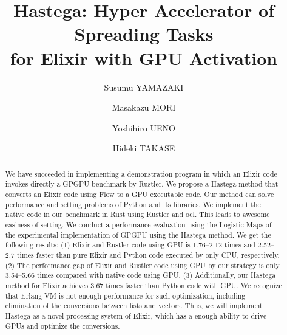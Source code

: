 \documentclass[sigplan,table]{acmart}
\begin{document}
\title{Hastega: Hyper Accelerator of Spreading Tasks \\
for Elixir with GPU Activation}

\author{Susumu YAMAZAKI}

\author{Masakazu MORI}

\author{Yoshihiro UENO}

\author{Hideki TAKASE}

\renewcommand{\shortauthors}{S. Yamazaki et al.}


\begin{abstract}
We have succeeded in implementing a demonstration program in which an Elixir code invokes directly a GPGPU benchmark by Rustler. We propose a Hastega method that converts an Elixir code using Flow to a GPU executable code. Our method can solve performance and setting problems of Python and its libraries. We implement the native code in our benchmark in Rust using Rustler and ocl. This leads to awesome easiness of setting. We conduct a performance evaluation using the Logistic Maps of the experimental implementation of GPGPU using the Hastega method. We get the following results: (1) Elixir and Rustler code using GPU is 1.76--2.12 times and 2.52--2.7 times faster than pure Elixir and Python code executed by only CPU, respectively. (2) The performance gap of Elixir and Rustler code using GPU by our strategy is only 3.54--5.66 times compared with native code using GPU. (3) Additionally, our Hastega method for Elixir achieves 3.67 times faster than Python code with GPU. We recognize that Erlang VM is not enough performance for such optimization, including elimination of the conversions between lists and vectors. Thus, we will implement Hastega as a novel processing system of Elixir, which has a enough ability to drive GPUs and optimize the conversions.
\end{abstract}
\end{document}
